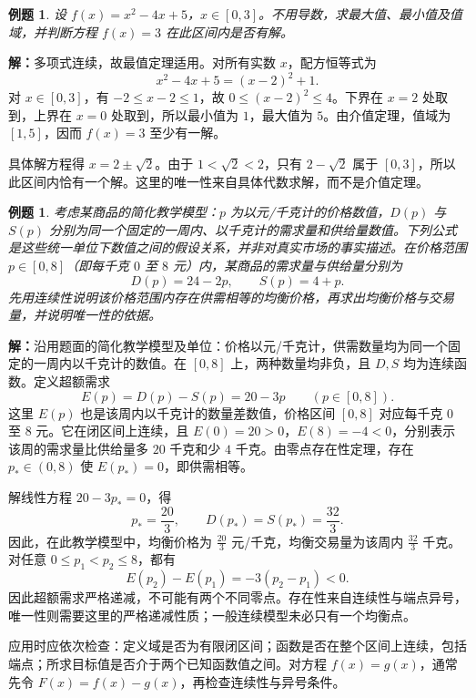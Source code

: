 \documentclass[UTF8,fontset=fandol,11pt]{ctexart}
\newtheorem{example}[definition]{例题}
\begin{document}
\begin{example}
设 $f(x)=x^2-4x+5$，$x\in[0,3]$。不用导数，求最大值、最小值及值域，并判断方程 $f(x)=3$ 在此区间内是否有解。
\end{example}
\par\noindent\textbf{解：}多项式连续，故最值定理适用。对所有实数 $x$，配方恒等式为
\[
x^2-4x+5=(x-2)^2+1.
\]
对 $x\in[0,3]$，有 $-2\leq x-2\leq1$，故 $0\leq(x-2)^2\leq4$。下界在 $x=2$ 处取到，上界在 $x=0$ 处取到，所以最小值为 $1$，最大值为 $5$。由介值定理，值域为 $[1,5]$，因而 $f(x)=3$ 至少有一解。

具体解方程得 $x=2\pm\sqrt{2}$。由于 $1<\sqrt{2}<2$，只有 $2-\sqrt{2}$ 属于 $[0,3]$，所以此区间内恰有一个解。这里的唯一性来自具体代数求解，而不是介值定理。\par
\begin{example}
考虑某商品的简化教学模型：$p$ 为以元/千克计的价格数值，$D(p)$ 与 $S(p)$ 分别为同一个固定的一周内、以千克计的需求量和供给量数值。下列公式是这些统一单位下数值之间的假设关系，并非对真实市场的事实描述。在价格范围 $p\in[0,8]$（即每千克 $0$ 至 $8$ 元）内，某商品的需求量与供给量分别为
\[
D(p)=24-2p,\qquad S(p)=4+p.
\]
先用连续性说明该价格范围内存在供需相等的均衡价格，再求出均衡价格与交易量，并说明唯一性的依据。
\end{example}
\par\noindent\textbf{解：}沿用题面的简化教学模型及单位：价格以元/千克计，供需数量均为同一个固定的一周内以千克计的数值。在 $[0,8]$ 上，两种数量均非负，且 $D,S$ 均为连续函数。定义超额需求
\[
E(p)=D(p)-S(p)=20-3p\qquad(p\in[0,8]).
\]
这里 $E(p)$ 也是该周内以千克计的数量差数值，价格区间 $[0,8]$ 对应每千克 $0$ 至 $8$ 元。它在闭区间上连续，且 $E(0)=20>0$，$E(8)=-4<0$，分别表示该周的需求量比供给量多 $20$ 千克和少 $4$ 千克。由零点存在性定理，存在 $p_*\in(0,8)$ 使 $E(p_*)=0$，即供需相等。

解线性方程 $20-3p_*=0$，得
\[
p_*=\frac{20}{3},\qquad D(p_*)=S(p_*)=\frac{32}{3}.
\]
因此，在此教学模型中，均衡价格为 $\frac{20}{3}$ 元/千克，均衡交易量为该周内 $\frac{32}{3}$ 千克。
对任意 $0\leq p_1<p_2\leq8$，都有
\[
E(p_2)-E(p_1)=-3(p_2-p_1)<0.
\]
因此超额需求严格递减，不可能有两个不同零点。存在性来自连续性与端点异号，唯一性则需要这里的严格递减性质；一般连续模型未必只有一个均衡点。\par
应用时应依次检查：定义域是否为有限闭区间；函数是否在整个区间上连续，包括端点；所求目标值是否介于两个已知函数值之间。对方程 $f(x)=g(x)$，通常先令 $F(x)=f(x)-g(x)$，再检查连续性与异号条件。
\end{document}
